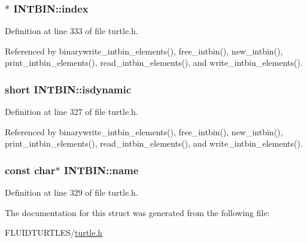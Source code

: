 \hypertarget{struct_i_n_t_b_i_n_af0c75ad6df4bb99206cf6aeebe7181a9}{
\subsubsection[{index}]{$\ast$ I\-N\-T\-B\-I\-N\-::index}}\label{struct_i_n_t_b_i_n_af0c75ad6df4bb99206cf6aeebe7181a9}


Definition at line 333 of file turtle.\-h.



Referenced by binarywrite\-\_\-intbin\-\_\-elements(), free\-\_\-intbin(), new\-\_\-intbin(), print\-\_\-intbin\-\_\-elements(), read\-\_\-intbin\-\_\-elements(), and write\-\_\-intbin\-\_\-elements().

\hypertarget{struct_i_n_t_b_i_n_ad45ecc214b13cb42b28e488ee54c541a}{
\subsubsection[{isdynamic}]{\setlength{\rightskip}{0pt plus 5cm}short I\-N\-T\-B\-I\-N\-::isdynamic}}\label{struct_i_n_t_b_i_n_ad45ecc214b13cb42b28e488ee54c541a}


Definition at line 327 of file turtle.\-h.



Referenced by binarywrite\-\_\-intbin\-\_\-elements(), free\-\_\-intbin(), new\-\_\-intbin(), print\-\_\-intbin\-\_\-elements(), read\-\_\-intbin\-\_\-elements(), and write\-\_\-intbin\-\_\-elements().

\hypertarget{struct_i_n_t_b_i_n_a6d65e8d76c65b5049011a444aa2060fd}{
\subsubsection[{name}]{\setlength{\rightskip}{0pt plus 5cm}const char$\ast$ I\-N\-T\-B\-I\-N\-::name}}\label{struct_i_n_t_b_i_n_a6d65e8d76c65b5049011a444aa2060fd}


Definition at line 329 of file turtle.\-h.



The documentation for this struct was generated from the following file\-:\begin{DoxyCompactItemize}
\item 
F\-L\-U\-I\-D\-T\-U\-R\-T\-L\-E\-S/\hyperlink{turtle_8h}{turtle.\-h}\end{DoxyCompactItemize}
